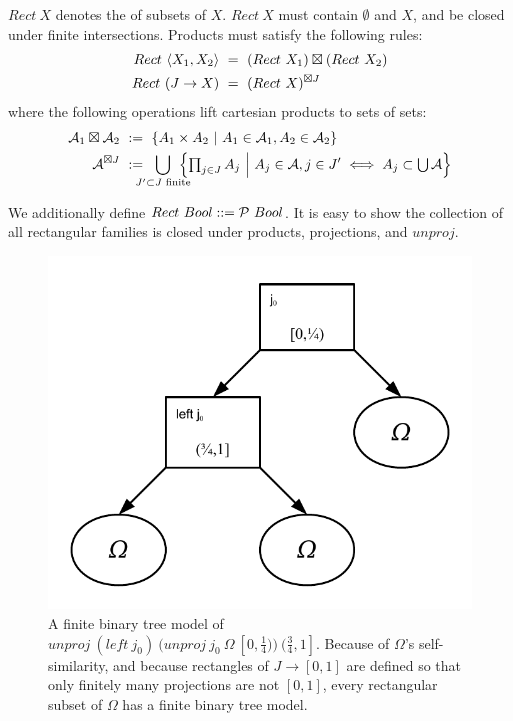 \begin{definition}
\label{def:standard-rectangle}
$Rect~X$ denotes the  of subsets of $X$.
$Rect~X$ must contain $\emptyset$ and $X$, and be closed under finite intersections.
Products must satisfy the following rules:
\begin{align}
	Rect~\langle{X_1,X_2}\rangle &\ = \ (Rect~X_1) \boxtimes (Rect~X_2)
	\label{eqn:standard-rect-finite-product-rule}
\\
	Rect~(J \to X) &\ = \ (Rect~X)^{\boxtimes J}
	\label{eqn:standard-rect-arbitrary-product-rule}
\end{align}
where the following operations lift cartesian products to sets of sets:
\begin{align}
	\A_1 \boxtimes \A_2 &\ := \ \setb{A_1 \times A_2}{A_1 \in \A_1, A_2 \in \A_2}
\\
	\A^{\boxtimes J} &\ := \ \!\!\!\!\!\!\!\displaystyle\bigcup_{J' \subset J \text{ finite}}\!\!\!\!\!\! \left\{\textstyle\prod_{j \in J} A_j\ \middle|\ A_j \in \A, j \in J' \iff A_j \subset \U\A\right\}
\label{eqn:rectangular-product}
\end{align}
\end{definition}

We additionally define $Rect~Bool ::= \mathcal{P}~Bool$.
It is easy to show the collection of all rectangular families is closed under products, projections, and $unproj$.

\begin{figure}[tb!]\centering
\includegraphics[width=4.5in]{figures/random-tree-rect}
\caption[A finite model of a rectangular subset of $\Omega$]{A finite binary tree model of $unproj~(left~j_0)~(unproj~j_0~\Omega~[0,\frac{1}{4}))~(\frac{3}{4},1]$. Because of $\Omega$'s self-similarity, and because rectangles of $J \to [0,1]$ are defined so that only finitely many projections are not $[0,1]$, every rectangular subset of $\Omega$ has a finite binary tree model.}
\label{fig:omega-rect-tree}
\end{figure}

